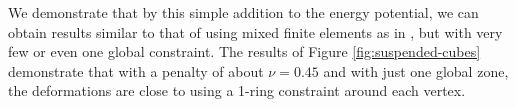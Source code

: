 We demonstrate that by this simple addition to the energy potential, we can obtain results similar to 
that of using mixed finite elements as in \cite{Irving:2007}, but with very few or even 
one global constraint. The results of Figure  \ref{fig:suspended-cubes} demonstrate
that with a penalty of about $\nu = 0.45$ and with just one global zone, the deformations are close to 
using a 1-ring constraint around each vertex. 

